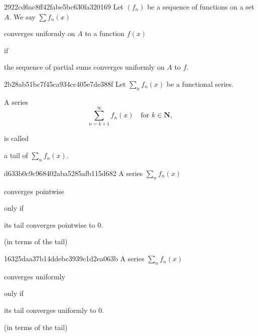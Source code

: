 \begin{note}{2922cd6ac8ff42fabe5bc630fa320169}
    Let \({ (f_n) }\) be a sequence of functions on a set \({ A }\).
    We say \({ \sum f_n(x) }\) \begin{icloze}{2}converges uniformly on \({ A }\) to a function \({ f(x) }\)\end{icloze} if \begin{icloze}{1}the sequence of partial sums converges uniformly on \({ A }\) to \({ f }\).\end{icloze}
\end{note}

\begin{note}{2b28ab51bc7f45ca934cc405e7de388f}
    Let \({ \sum_n f_n(x) }\) be a functional series.
    \begin{icloze}{1}
        A series
        \[
            \sum_{n=k+1}^{\infty} f_n(x) \quad \text{for } k \in \mathbf{N},
        \]
    \end{icloze}
    is called \begin{icloze}{2}a tail of \({ \sum_n f_n(x) }\).\end{icloze}
\end{note}

\begin{note}{d633b0c9c968402aba5285afb115d682}
    A series \({ \sum_n f_n(x) }\) \begin{icloze}{2}converges pointwise\end{icloze} \begin{icloze}{3}only if\end{icloze} \begin{icloze}{1}its tail converges pointwise to \({ 0 }\).\end{icloze}

    \begin{center}
        \tiny
        (in terms of the tail)
    \end{center}
\end{note}

\begin{note}{16325daa37b14ddebc3939e1d2ea063b}
    A series \({ \sum_n f_n(x) }\) \begin{icloze}{2}converges uniformly\end{icloze} \begin{icloze}{3}only if\end{icloze} \begin{icloze}{1}its tail converges uniformly to \({ 0 }\).\end{icloze}

    \begin{center}
        \tiny
        (in terms of the tail)
    \end{center}
\end{note}

